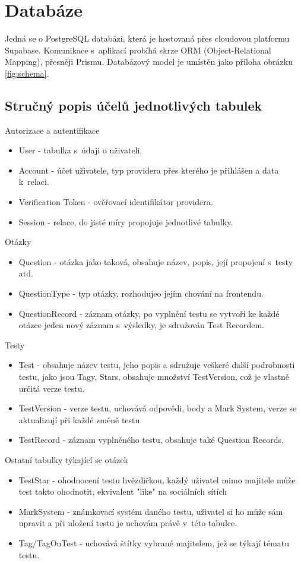 \documentclass[12pt, a4paper,
openright
]{report}
\begin{document}
\clearpage
\section{Databáze}

Jedná se o PostgreSQL databázi, která je hostovaná přes cloudovou platformu Supabase. Komunikace s~aplikací probíhá skrze ORM (Object-Relational Mapping), přesněji Prismu. Databázový model je umístěn jako příloha obrázku \ref{fig:schema}.

\subsection{Stručný popis účelů jednotlivých tabulek}

Autorizace a autentifikace
\begin{itemize}[itemsep=0pt]
	\item User - tabulka s~údaji o uživateli.
	\item Account - účet uživatele, typ providera přes kterého je přihlášen a data k~relaci.
	\item Verification Token - ověřovací identifikátor providera.
	\item Session - relace, do jisté míry propojuje jednotlivé tabulky.
\end{itemize} 
Otázky
\begin{itemize}
	\item Question - otázka jako taková, obsahuje název, popis, její propojení s~testy atd.
	\item QuestionType - typ otázky, rozhodujeo  jejím chování na frontendu.
	\item QuestionRecord - záznam otázky, po vyplnění testu se vytvoří ke každé otázce jeden nový záznam s~výsledky, je sdružován Test Recordem.
\end{itemize}
Testy
\begin{itemize}
	\item Test - obsahuje název testu, jeho popis a sdružuje veškeré další podrobnosti testu, jako jsou Tagy, Stars, obsahuje množství TestVersion, což je vlastně určitá verze testu.
	\item TestVersion - verze testu, uchovává odpovědi, body a Mark System, verze se aktualizují při každé změně testu.
	\item TestRecord - záznam vyplněného testu, obsahuje také Question Records.
\end{itemize}
Ostatní tabulky týkající se otázek
\begin{itemize}
	\item TestStar - ohodnocení testu hvězdičkou, každý uživatel mimo majitele může test takto ohodnotit, ekvivalent "like" na sociálních sítích
	\item MarkSystem - známkovací systém daného testu, uživatel si ho může sám upravit a při uložení testu je uchovám právě v~této tabulce.
	\item Tag/TagOnTest - uchovává štítky vybrané majitelem, jež se týkají tématu testu.
\end{itemize}
\end{document}
